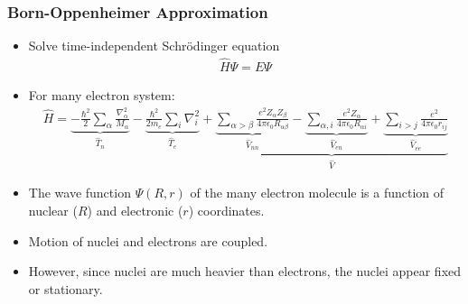 \documentclass[slidestop,mathserif,compress,xcolor=svgnames]{beamer}
\begin{document}
\begin{frame}
\frametitle{\small Born-Oppenheimer Approximation}
\footnotesize{
\begin{itemize}
\item Solve time-independent Schr\"{o}dinger equation
\begin{align*}
\hat{H}\Psi = E\Psi
\end{align*}
\item For many electron system:
\begin{align*}
\hat{H} = \underbrace{-\frac{\hbar^2}{2}\sum_\alpha\frac{\nabla^2_\alpha}{M_\alpha}}_{\hat{T}_n} - \underbrace{\frac{\hbar^2}{2m_e}\sum_i\nabla^2_i}_{\hat{T}_e} + \underbrace{\underbrace{\sum_{\alpha>\beta}\frac{e^2Z_{\alpha}Z_{\beta}}{4\pi\epsilon_0R_{\alpha\beta}}}_{\hat{V}_{nn}} - \underbrace{\sum_{\alpha,i}\frac{e^2Z_{\alpha}}{4\pi\epsilon_0R_{\alpha i}}}_{\hat{V}_{en}} + \underbrace{\sum_{i>j}\frac{e^2}{4\pi\epsilon_0r_{ij}}}_{\hat{V}_{ee}}}_{\hat{V}}
\end{align*}
\item The wave function $\Psi(R,r)$ of the many electron molecule is a function of nuclear ($R$) and electronic ($r$) coordinates.
\item Motion of nuclei and electrons are coupled.
\item However, since nuclei are much heavier than electrons, the nuclei appear fixed or stationary.
\end{itemize}
}
\end{frame}
\end{document}
